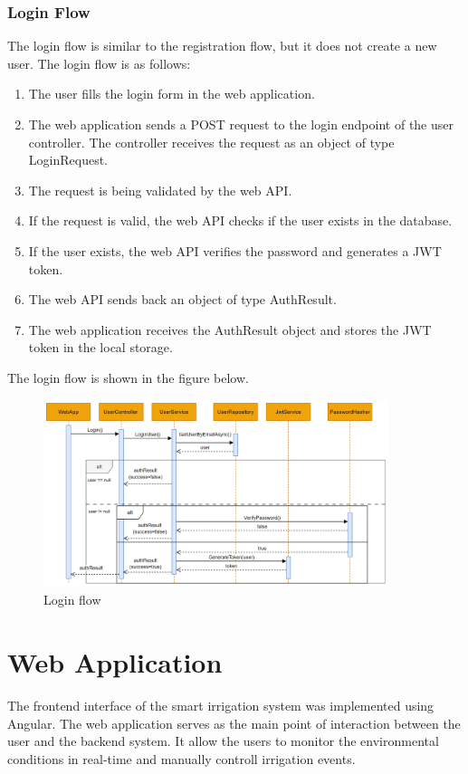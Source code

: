 \subsubsection{Login Flow}
The login flow is similar to the registration flow, but it does not create a new user.
The login flow is as follows:
\begin{enumerate}
    \item The user fills the login form in the web application.
    \item The web application sends a POST request to the login endpoint of the user controller. The controller
    receives the request as an object of type LoginRequest.
    \item The request is being validated by the web API.
    \item If the request is valid, the web API checks if the user exists in the database.
    \item If the user exists, the web API verifies the password and generates a JWT token.
    \item The web API sends back an object of type AuthResult.
    \item The web application receives the AuthResult object and stores the JWT token in the local storage.
\end{enumerate}

The login flow is shown in the figure below.
\begin{figure}[H]
    \centering
    \includegraphics[width=0.9\textwidth]{images/login-flow.png}
    \caption{Login flow}
    \label{fig:login-flow}
\end{figure}

\section {Web Application}
The frontend interface of the smart irrigation system was implemented using Angular. The web application serves as the main
point of interaction between the user and the backend system. It allow the users to monitor the environmental conditions
in real-time and manually controll irrigation events.

